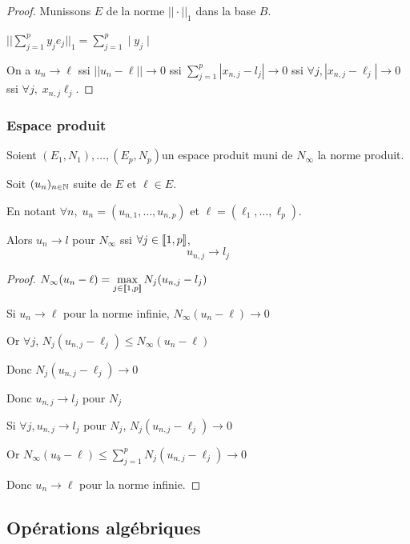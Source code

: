 \begin{proof}
    Munissons $E$ de la norme $||\cdot||_1$ dans la base $B$. 

    $\displaystyle || \sum_{j =  1}^{p} y_je_j||_1 = \sum_{j = 1}^{p }\mid y_j\mid$

    On a $u_n \to \ell$ ssi $|| u_n - \ell|| \to 0$ ssi 
    $\displaystyle \sum_{j = 1}^{p }|x_{n, j} - l_j| \to 0$ ssi 
    $\forall j, |x_{n, j} - \ell_j| \to 0$ ssi $\forall j, \; x_{n, j} \ell_j$. 
\end{proof}

\subsubsection{Espace produit}

\begin{definition}{}{}
    Soient $(E_1, N_1), \dots, (E_p, N_p)$un espace produit muni de $N_\infty$ la norme produit. 

    Soit $(u_n)_{n \in \mathbb{N}}$ suite de $E$ et $\ell \in E$. 

    En notant $\forall n, \; u_n = (u_{n, 1}, \dots, u_{n, p})$ et $\ell = (\ell_1, \dots, \ell_p)$. 

    Alors $u_n \to l$ pour $N_\infty$ ssi $\forall j \in [\![1, p]\!]$, 
    $$u_{n, j} \to l_j$$
\end{definition}


\begin{proof}
    $\displaystyle N_\infty(u_n - \ell) = \max_{j \in [\![1, p]\!]} N_j(u_{n, j} - l_j)$

    Si $u_n \to \ell$ pour la norme infinie, $N_\infty(u_n - \ell) \to 0$

    Or $\forall j, \, N_j(u_{n, j}- \ell_j) \leqslant N_\infty(u_n - \ell)$

    Donc $N_j(u_{n, j} - \ell_j) \to 0$ 

    Donc $u_{n, j} \to l_j$ pour $N_j$

    Si $\forall j, u_{n, j} \to l_j$ pour $N_j$, $N_j(u_{n, j} - \ell_j) \to 0$

    Or $\displaystyle N_\infty(u_b - \ell) \leqslant \sum_{j = 1}^{p } N_j(u_{n, j} - \ell_j) \to 0$

    Donc $u_n \to \ell$ pour la norme infinie. 
\end{proof}



\subsection{Opérations algébriques}

